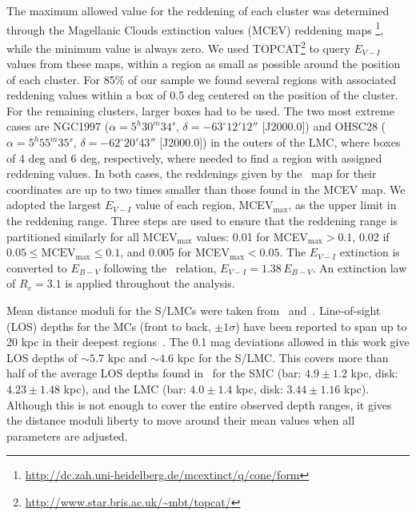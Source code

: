\documentclass{aa}
\begin{document}
The maximum allowed value for the reddening of each cluster was determined
through the Magellanic Clouds extinction values (MCEV) reddening maps
\citep{Haschke_2011}\footnote{\url{
http://dc.zah.uni-heidelberg.de/mcextinct/q/cone/form}}, while
the minimum value is always zero.
%
We used TOPCAT\footnote{\url{http://www.star.bris.ac.uk/~mbt/topcat/}}
to query $E_{V-I}$ values from these maps, within a region as small as possible
around the position of each cluster.
For 85\% of our sample we found several regions with associated reddening
values within a box of 0.5 deg centered on the position of the cluster.
For the remaining clusters, larger boxes had to be used. The two most extreme
cases are NGC1997
($\alpha{=}5^h30^m34^s$, $\delta{=}-63^\circ12'12''$ [J2000.0]) and OHSC28
($\alpha{=}5^h55^m35^s$, $\delta{=}-62^\circ20'43''$ [J2000.0]) in the outers
of the LMC, where boxes of 4 deg and 6 deg, respectively, where needed to find a
region with assigned reddening values. In both cases, the reddenings given by
the~\cite{Schlafly_2011} map for their coordinates are up to two times smaller
than those found in the MCEV map.
%
We adopted the largest $E_{V-I}$ value of each region, MCEV$_{\max}$, as the
upper limit in the reddening range. Three steps are used to ensure that the
reddening range is partitioned similarly for all MCEV$_{\max}$ values: 0.01 for
MCEV$_{\max} {>}0.1$, 0.02 if $0.05{\leq}\mathrm{MCEV}_{\max}{\leq}0.1$, and
0.005 for MCEV$_{\max}{<}0.05$.
%
The $E_{V-I}$ extinction is converted to $E_{B-V}$
following the~\cite{Tammann_2003} relation, $E_{V-I}{=}1.38\,E_{B-V}$.
An extinction law of $R_v{=}3.1$ is applied throughout the analysis.

Mean distance moduli for the S/LMCs  were taken
from~\cite{de_Grijs_2015} and~\cite{de_Grijs_2014}.
%
Line-of-sight (LOS) depths for the MCs (front to back, $\pm1\sigma$) have been
reported to span up to 20 kpc in their deepest
regions~\citep{Subramanian_2009,Nidever_2013,Scowcroft_2015}.
%
The 0.1 mag deviations allowed in this work give LOS depths of ${\sim}5.7$ kpc
and ${\sim}4.6$ kpc for the S/LMC\@. This covers more than half of the average
LOS depths found in~\cite{Subramanian_2009} for the SMC (bar: $4.9\pm1.2$ kpc,
disk: $4.23\pm1.48$ kpc), and the LMC (bar: $4.0\pm1.4$ kpc, disk: $3.44\pm1.16$
kpc).
Although this is not enough to cover the entire observed depth ranges, it gives
the distance moduli liberty to move around their mean values when all parameters
are adjusted.
\end{document}
